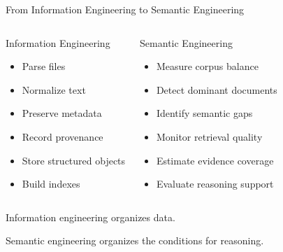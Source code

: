 \documentclass[aspectratio=169]{beamer}
\begin{document}

\begin{frame}{From Information Engineering to Semantic Engineering}

\begin{columns}[T]


\begin{block}{Information Engineering}

\begin{itemize}
\item Parse files
\item Normalize text
\item Preserve metadata
\item Record provenance
\item Store structured objects
\item Build indexes
\end{itemize}

\end{block}


\begin{block}{Semantic Engineering}

\begin{itemize}
\item Measure corpus balance
\item Detect dominant documents
\item Identify semantic gaps
\item Monitor retrieval quality
\item Estimate evidence coverage
\item Evaluate reasoning support
\end{itemize}

\end{block}

\end{columns}

\vspace{0.45cm}

\begin{center}
\Large
Information engineering organizes data.

Semantic engineering organizes the conditions for reasoning.
\end{center}

\end{frame}
\end{document}
